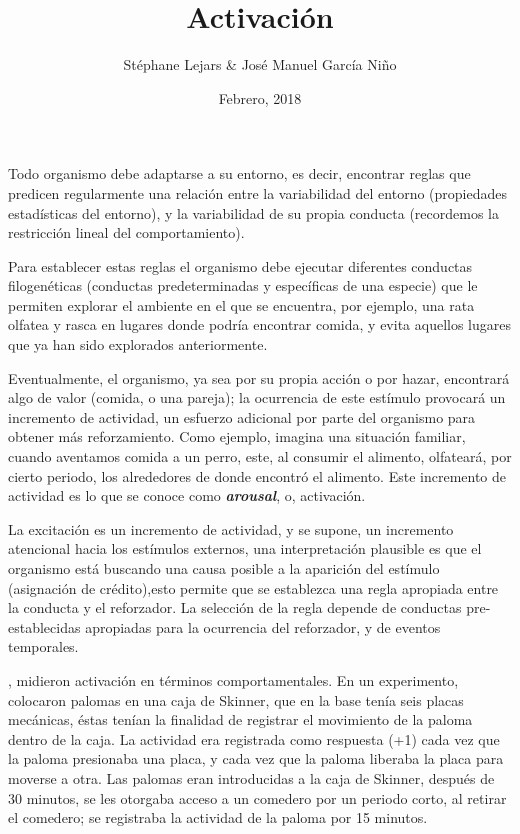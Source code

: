 \documentclass[12pt, letterpaper]{article}
\title{{\huge Activación}}
\date{Febrero, 2018}
\author{Stéphane Lejars \& José Manuel García Niño}
\begin{document}
\maketitle
	
	Todo organismo debe adaptarse a su entorno, es decir, encontrar reglas que predicen regularmente una relación entre la variabilidad del entorno (propiedades estadísticas del entorno), y la variabilidad de su propia conducta (recordemos la restricción lineal del comportamiento).

	Para establecer estas reglas el organismo debe ejecutar diferentes conductas filogenéticas (conductas predeterminadas y específicas de una especie) que le permiten explorar el ambiente en el que se encuentra, por ejemplo, una rata olfatea y rasca en lugares donde podría encontrar comida, y evita aquellos lugares que ya han sido explorados anteriormente. 

	Eventualmente, el organismo, ya sea por su propia acción o por hazar, encontrará algo de valor (comida, o una pareja); la ocurrencia de este estímulo provocará un incremento de actividad, un esfuerzo adicional por parte del organismo para obtener más reforzamiento. Como ejemplo, imagina una situación familiar, cuando aventamos comida a un perro, este, al consumir el alimento, olfateará, por cierto periodo, los alrededores de donde encontró el alimento. Este incremento de actividad es lo que se conoce como \textbf{\textit{arousal}}, o, activación.

	La excitación es un incremento de actividad, y se supone, un incremento atencional hacia los estímulos externos, una interpretación plausible es que el organismo está buscando una causa posible a la aparición del estímulo (asignación de crédito),esto permite que se establezca una regla apropiada entre la conducta y el reforzador. La selección de la regla depende de conductas pre-establecidas apropiadas para la ocurrencia del reforzador, y de eventos temporales. \cite{staddon}
	
	\cite{killeen}, midieron activación en términos comportamentales. En un experimento, colocaron palomas en una caja de Skinner, que en la base tenía seis placas mecánicas, éstas tenían la finalidad de registrar el movimiento de la paloma dentro de la caja. La actividad era registrada como respuesta (+1) cada vez que la paloma presionaba una placa, y cada vez que la paloma liberaba la placa para moverse a otra.
	Las palomas eran introducidas a la caja de Skinner, después de 30 minutos, se les otorgaba acceso a un comedero por un periodo corto, al retirar el comedero; se registraba la actividad de la paloma por 15 minutos. 
\end{document}

